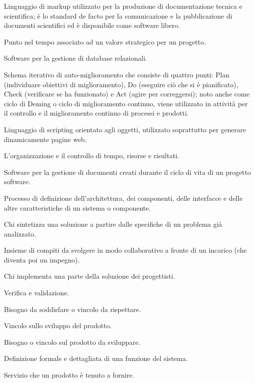 \item[LaTEX] Linguaggio di markup utilizzato per la produzione di documentazione tecnica e scientifica; è lo standard de facto per la comunicazione e la pubblicazione di documenti scientifici ed è disponibile come software libero.
\item[milestone] Punto nel tempo associato ad un valore strategico per un progetto.
\item[MySQL] Software per la gestione di database relazionali.
\item[schema PDCA] Schema iterativo di auto-miglioramento che consiste di quattro punti: Plan (individuare obiettivi di miglioramento), Do (eseguire ciò che si è pianificato), Check (verificare se ha funzionato) e Act (agire per correggersi); noto anche come ciclo di Deming o ciclo di miglioramento continuo, viene utilizzato in attività per il controllo e il miglioramento continuo di processi e prodotti.
\item[PHP] Linguaggio di scripting orientato agli oggetti, utilizzato soprattutto per generare dinamicamente pagine web.
\item[pianificazione] L'organizzazione e il controllo di tempo, risorse e risultati.
\item[PragmaDB] Software per la gestione di documenti creati durante il ciclo di vita di un progetto software.
\item[progettazione] Processo di definizione dell'architettura, dei componenti, delle interfacce e delle altre caratteristiche di un sistema o componente.
\item[progettista] Chi sintetizza una soluzione a partire dalle specifiche di un problema già analizzato.
\item[progetto] Insieme di compiti da svolgere in modo collaborativo a fronte di un incarico (che diventa poi un impegno).
\item[programmatore] Chi implementa una parte della soluzione dei progettisti.
\item[qualifica] Verifica e validazione.
\item[requisito] Bisogno da soddisfare o vincolo da rispettare.
\item[requisito di processo] Vincolo sullo sviluppo del prodotto.
\item[requisito di prodotto] Bisogno o vincolo sul prodotto da sviluppare.
\item[requisito di sistema] Definizione formale e dettagliata di una funzione del sistema.
\item[requisito funzionale] Servizio che un prodotto è tenuto a fornire.
